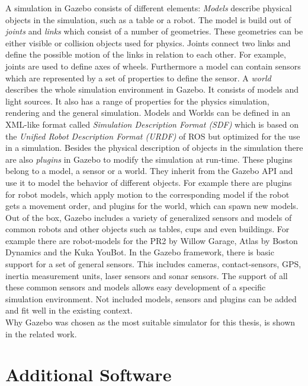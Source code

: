 A simulation in Gazebo consists of different elements: \textit{Models} describe physical objects in the simulation, such as a table or a robot. The model is build out of \textit{joints} and \textit{links} which consist of a number of geometries. These geometries can be either visible or collision objects used for physics. Joints connect two links and define the possible motion of the links in relation to each other. For example, joints are used to define axes of wheels. Furthermore a model can contain sensors which are represented by a set of properties to define the sensor. A \textit{world} describes the whole simulation environment in Gazebo. It consists of models and light sources. It also has a range of properties for the physics simulation, rendering and the general simulation. Models and Worlds can be defined in an XML-like format called \textit{Simulation Description Format (SDF)} which is based on the \textit{Unified Robot Description Format (URDF)} of ROS but optimized for the use in a simulation. Besides the physical description of objects in the simulation there are also \textit{plugins} in Gazebo to modify the simulation at run-time. These plugins belong to a model, a sensor or a world. They inherit from the Gazebo API and use it to model the behavior of different objects. For example there are plugins for robot models, which apply motion to the corresponding model if the robot gets a movement order, and plugins for the world, which can spawn new models.\\
Out of the box, Gazebo includes a variety of generalized sensors and models of common robots and other objects such as tables, cups and even buildings. For example there are robot-models for the PR2 by Willow Garage, Atlas by Boston Dynamics and the Kuka YouBot. In the Gazebo framework, there is basic support for a set of general sensors. This includes cameras, contact-sensors, GPS, inertia measurement units, laser sensors and sonar sensors. The support of all these common sensors and models allows easy development of a specific simulation environment. Not included models, sensors and plugins can be added and fit well in the existing context.\\
Why Gazebo was chosen as the most suitable simulator for this thesis, is shown in the related work.


\section{Additional Software}
\label{sec:additional_software}
